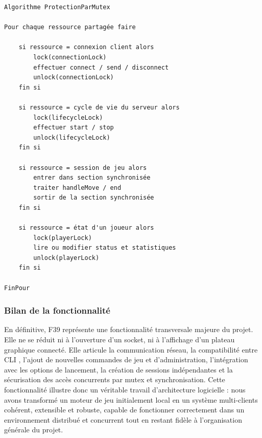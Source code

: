 \documentclass[a4paper]{article}
\begin{document}
    {\small
\begin{verbatim}
Algorithme ProtectionParMutex

Pour chaque ressource partagée faire

    si ressource = connexion client alors
        lock(connectionLock)
        effectuer connect / send / disconnect
        unlock(connectionLock)
    fin si

    si ressource = cycle de vie du serveur alors
        lock(lifecycleLock)
        effectuer start / stop
        unlock(lifecycleLock)
    fin si

    si ressource = session de jeu alors
        entrer dans section synchronisée
        traiter handleMove / end
        sortir de la section synchronisée
    fin si

    si ressource = état d'un joueur alors
        lock(playerLock)
        lire ou modifier status et statistiques
        unlock(playerLock)
    fin si

FinPour
\end{verbatim}
}

\subsubsection{Bilan de la fonctionnalité}

En définitive, F39 représente une fonctionnalité transversale majeure du projet.
Elle ne se réduit ni à l'ouverture d'un socket, ni à l'affichage d'un plateau
graphique connecté. Elle articule la communication réseau, la compatibilité
entre CLI , l'ajout de nouvelles commandes de jeu et d'administration,
l'intégration avec les options de lancement, la création de sessions
indépendantes et la sécurisation des accès concurrents par mutex et
synchronisation. Cette fonctionnalité illustre donc un véritable travail
d'architecture logicielle : nous avons transformé un moteur de jeu initialement
local en un système multi-clients cohérent, extensible et robuste, capable de
fonctionner correctement dans un environnement distribué et concurrent tout en
restant fidèle à l'organisation générale du projet.


\end{document}
